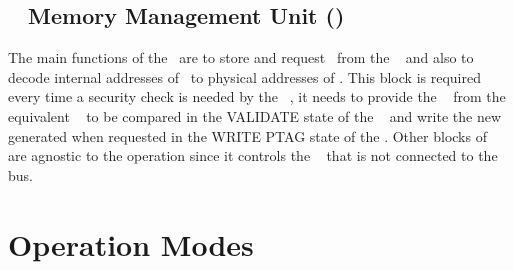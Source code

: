 



\subsection{\ptag~ Memory Management Unit (\pmmu)}
\label{subsec:pmmu}
The main functions of the \pmmu~are to store and request \ptags~from the \ptagmem~ and also to decode internal addresses of \ptags~to physical addresses of \ptagmem. This block is required every time a security check is needed by the \handler~, it needs to provide the  \ptag~ from the equivalent \slines~  to be compared in the VALIDATE state of the \seceng~  and write the new generated \ptags when requested in the WRITE PTAG state of the \seceng.  Other blocks of \cshia~ are agnostic to the \pmmu operation since  it controls the \ptagmem~ that is not connected to the bus.


\section{Operation Modes}
\label{sec:opmodes}



